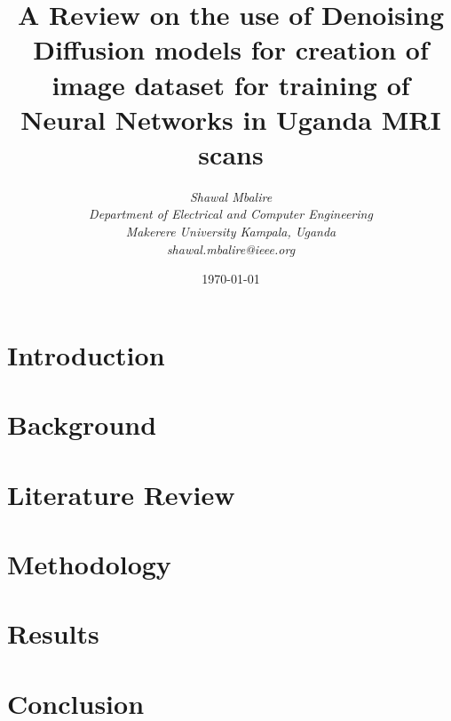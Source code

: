 \documentclass{IEEEtran}
\title{A Review on the use of Denoising Diffusion models for creation of image dataset for training of Neural Networks in Uganda MRI scans}
\author{
    \textit{Shawal Mbalire} \\
    \textit{Department of Electrical and Computer Engineering} \\
    \textit{Makerere University Kampala, Uganda} \\
    \textit{shawal.mbalire@ieee.org}
}
\date{\today}
\begin{document}
    \maketitle
    
    \section{Introduction}\label{sec:introduction}
    
    \section{Background}\label{sec:background}
    
    \section{Literature Review}\label{sec:literature}
    
    \section{Methodology}\label{sec:methodology}
    
    \section{Results}\label{sec:results}
    
    \section{Conclusion}\label{sec:conclusion}
    
    
    
\end{document}
